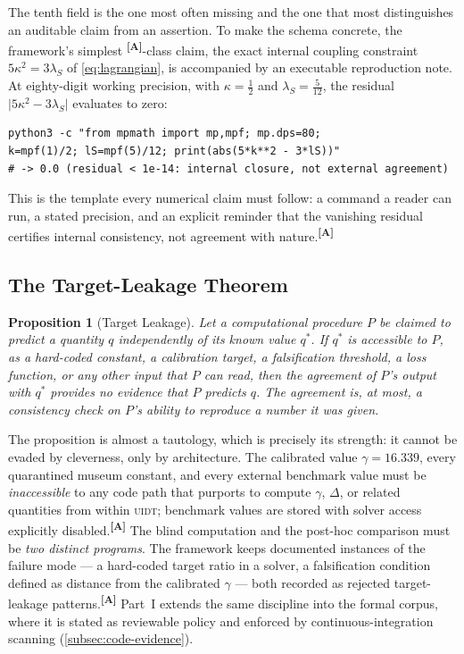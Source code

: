\documentclass[12pt,a4paper,twoside]{article}
\theoremstyle{plain}
\newtheorem{proposition}[theorem]{Proposition}
\theoremstyle{definition}
\theoremstyle{remark}
\newcommand{\UIDT}{\textsc{uidt}}
\newcommand{\catmark}[1]{\textsuperscript{\textsf{\textbf{[#1]}}}}
\begin{document}
\noindent The tenth field is the one most often missing and the one that
most distinguishes an auditable claim from an assertion. To make the
schema concrete, the framework's simplest \catmark{A}-class claim, the
exact internal coupling constraint $5\kappa^2 = 3\lambda_S$ of
\cref{eq:lagrangian}, is accompanied by an executable reproduction note.
At eighty-digit working precision, with $\kappa = \tfrac{1}{2}$ and
$\lambda_S = \tfrac{5}{12}$, the residual
$\lvert 5\kappa^2 - 3\lambda_S\rvert$ evaluates to zero:
\begin{verbatim}
python3 -c "from mpmath import mp,mpf; mp.dps=80;
k=mpf(1)/2; lS=mpf(5)/12; print(abs(5*k**2 - 3*lS))"
# -> 0.0 (residual < 1e-14: internal closure, not external agreement)
\end{verbatim}
This is the template every numerical claim must follow: a command a
reader can run, a stated precision, and an explicit reminder that the
vanishing residual certifies internal consistency, not agreement with
nature.\catmark{A}

\subsection{The Target-Leakage Theorem}
\label{subsec:target-leakage-theorem}

\begin{proposition}[Target Leakage]
\label{prop:target-leakage}
Let a computational procedure $P$ be claimed to predict a quantity $q$
independently of its known value $q^{\ast}$. If $q^{\ast}$ is accessible
to $P$, as a hard-coded constant, a calibration target, a falsification
threshold, a loss function, or any other input that $P$ can read, then
the agreement of $P$'s output with $q^{\ast}$ provides no evidence that
$P$ predicts $q$. The agreement is, at most, a consistency check on
$P$'s ability to reproduce a number it was given.
\end{proposition}

\noindent The proposition is almost a tautology, which is precisely its
strength: it cannot be evaded by cleverness, only by architecture. The
calibrated value $\gamma = 16.339$, every quarantined museum constant,
and every external benchmark value must be \emph{inaccessible} to any
code path that purports to compute $\gamma$, $\Delta$, or related
quantities from within \UIDT; benchmark values are stored with solver
access explicitly disabled.\catmark{A} The blind computation and the
post-hoc comparison must be \emph{two distinct programs}. The framework
keeps documented instances of the failure mode --- a hard-coded target
ratio in a solver, a falsification condition defined as distance from
the calibrated $\gamma$ --- both recorded as rejected target-leakage
patterns.\catmark{A} Part~I extends the same discipline into the formal
corpus, where it is stated as reviewable policy and enforced by
continuous-integration scanning (\cref{subsec:code-evidence}).
\end{document}
